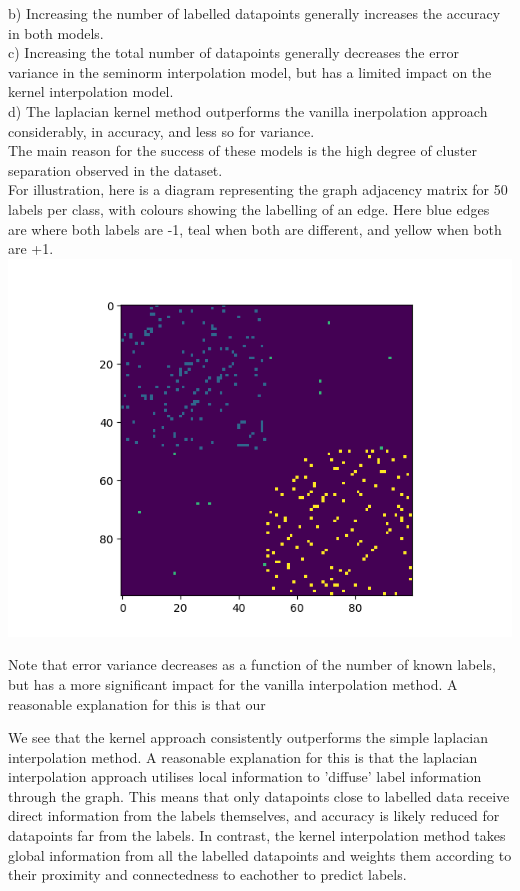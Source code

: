 \documentclass[12pt]{article}
\begin{document}
b) Increasing the number of labelled datapoints generally increases the accuracy in both models.\\

c) Increasing the total number of datapoints generally decreases the error variance in the seminorm interpolation
model, but has a limited impact on the kernel interpolation model. \\

d) The laplacian kernel method outperforms the vanilla inerpolation approach considerably, in accuracy, and less so
for variance. \\


The main reason for the success of these models is the high degree of
cluster separation observed in the dataset.
\\

For illustration, here is a diagram representing the graph adjacency matrix for 50 labels per class,
with colours showing the labelling of an edge. Here blue edges are where both 
labels are -1, teal when both are different, and yellow when both are +1.\\


\includegraphics{outputs/part2/graph_label_diagram.png}


Note that error variance decreases as a function of the number of known labels, but 
has a more significant impact for the vanilla interpolation method. A reasonable explanation for this is that our 



We see that the kernel approach consistently outperforms the simple laplacian
interpolation method. A reasonable explanation for this is that the laplacian
interpolation approach utilises local information to 'diffuse' label information through the graph. 
This means that only datapoints close to labelled data receive direct information from the 
labels themselves, and accuracy is likely reduced for datapoints far from the labels.
In contrast, the kernel interpolation method takes global information from all the 
labelled datapoints and weights them according to their proximity and connectedness 
to eachother to predict labels.
\newpage
\end{document}
